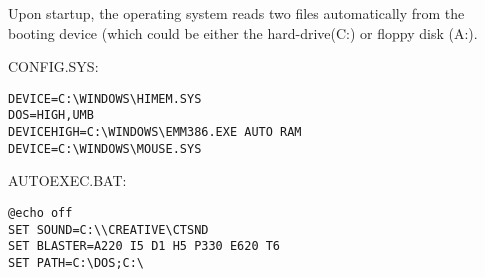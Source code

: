 \documentclass[book.tex]{subfiles}
\begin{document}
Upon startup, the operating system reads two files automatically from the booting device (which could be either the hard-drive(C:) or floppy disk (A:).\\
\par
CONFIG.SYS:\\
 \begin{lstlisting}[breaklines=true,breakindent=0em]
DEVICE=C:\WINDOWS\HIMEM.SYS
DOS=HIGH,UMB
DEVICEHIGH=C:\WINDOWS\EMM386.EXE AUTO RAM
DEVICE=C:\WINDOWS\MOUSE.SYS
\end{lstlisting}
\par
AUTOEXEC.BAT:\\
 \begin{lstlisting}[breaklines=true,breakindent=0em]
@echo off
SET SOUND=C:\\CREATIVE\CTSND
SET BLASTER=A220 I5 D1 H5 P330 E620 T6
SET PATH=C:\DOS;C:\ 
\end{lstlisting}
\end{document}
